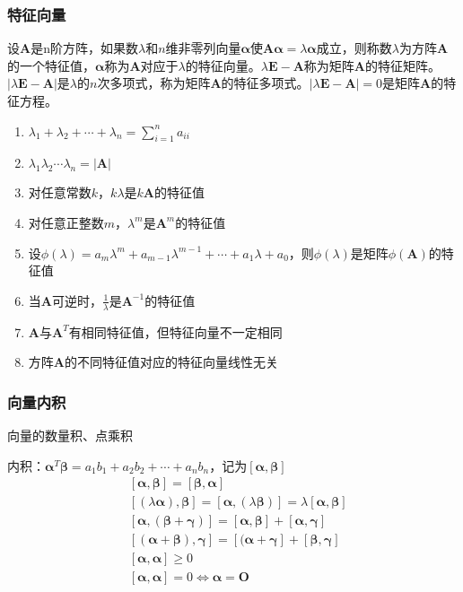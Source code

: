 \documentclass[12pt]{book}
\begin{document}
\subsubsection{特征向量}



设$\bm{A}$是n阶方阵，如果数$\lambda$和$n$维非零列向量$\bm{\alpha}$使$\bm{A \alpha}= \lambda \bm{\alpha}$成立，则称数$\lambda$为方阵$\bm{A}$的一个特征值，$\bm{\alpha}$称为$\bm{A}$对应于$\lambda$的特征向量。$\lambda \bm{E}-\bm{A}$称为矩阵$\bm{A}$的特征矩阵。$|\lambda\bm{E}-\bm{A}|$是$\lambda$的$n$次多项式，称为矩阵$\bm{A}$的特征多项式。$|\lambda\bm{E}-\bm{A}|=0$是矩阵$\bm{A}$的特征方程。


\begin{enumerate}[(1)]
    \item $\lambda_1+\lambda_2+\cdots+\lambda_n=\sum_{i=1}^{n}{a_{ii}}$
    \item $\lambda_{1}\lambda_{2}\cdots\lambda_{n}=|\bm{A}|$
    \item 对任意常数$k$，$k\lambda$是$k\bm{A}$的特征值 
    \item 对任意正整数$m$，$\lambda^m$是$\bm{A}^m$的特征值 
    \item 设$\phi(\lambda)=a_{m}\lambda^{m}+a_{m-1}\lambda^{m-1}+\cdots+a_{1}\lambda+a_{0}$，则$\phi(\lambda)$是矩阵$\phi(\bm{A})$的特征值
    \item 当$\bm{A}$可逆时，$\frac{1}{\lambda}$是$\bm{A}^{-1}$的特征值
    \item $\bm{A}$与$\bm{A}^T$有相同特征值，但特征向量不一定相同
    \item 方阵$\bm{A}$的不同特征值对应的特征向量线性无关
\end{enumerate}



\subsubsection{向量内积}


向量的数量积、点乘积

内积：$\bm{\alpha}^T\bm{\beta}=a_1 b_1 +a_2 b_2+\cdots+a_n b_n$，记为$[\bm{\alpha},\bm{\beta}]$
\begin{align*}
     & [\bm{\alpha},\bm{\beta}] = [\bm{\beta},\bm{\alpha}]                                                      \\
     & [(\lambda \bm{\alpha}),\bm{\beta}] = [\bm{\alpha},(\lambda\bm{\beta})] = \lambda[\bm{\alpha},\bm{\beta}] \\
     & [\bm{\alpha},(\bm{\beta}+\bm{\gamma})] = [\bm{\alpha},\bm{\beta}]+[\bm{\alpha},\bm{\gamma}]              \\
     & [(\bm{\alpha}+\bm{\beta}),\bm{\gamma}] = [(\bm{\alpha}+\bm{\gamma}]+[\bm{\beta},\bm{\gamma}]             \\
     & [\bm{\alpha},\bm{\alpha}]\geqslant 0\\
     & [\bm{\alpha},\bm{\alpha}]=0\Leftrightarrow \bm{\alpha}=\bm{O}
\end{align*}
\end{document}
